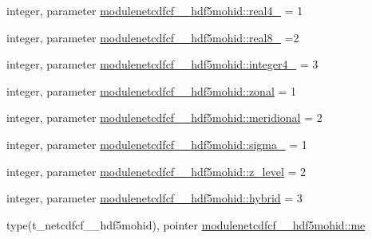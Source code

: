 \begin{DoxyCompactItemize}
\item 
integer, parameter \mbox{\hyperlink{namespacemodulenetcdfcf__2__hdf5mohid_a1839df8ab39bee44f30beaf7101ddcfc}{modulenetcdfcf\+\_\+\_\+hdf5mohid\+::real4\+\_\+}} = 1
\item 
integer, parameter \mbox{\hyperlink{namespacemodulenetcdfcf__2__hdf5mohid_ad75185339675809679215a369cbf65fa}{modulenetcdfcf\+\_\+\_\+hdf5mohid\+::real8\+\_\+}} =2
\item 
integer, parameter \mbox{\hyperlink{namespacemodulenetcdfcf__2__hdf5mohid_a6451136b901733e7e33a2ad13c62d2ba}{modulenetcdfcf\+\_\+\_\+hdf5mohid\+::integer4\+\_\+}} = 3
\item 
integer, parameter \mbox{\hyperlink{namespacemodulenetcdfcf__2__hdf5mohid_ad29870bbe3fad84a588db8bc5ab5fe1a}{modulenetcdfcf\+\_\+\_\+hdf5mohid\+::zonal}} = 1
\item 
integer, parameter \mbox{\hyperlink{namespacemodulenetcdfcf__2__hdf5mohid_aeb24e32948307415ab69fb7b05de6ae7}{modulenetcdfcf\+\_\+\_\+hdf5mohid\+::meridional}} = 2
\item 
integer, parameter \mbox{\hyperlink{namespacemodulenetcdfcf__2__hdf5mohid_aa77dc62d5ffd7b32add308a33868ad75}{modulenetcdfcf\+\_\+\_\+hdf5mohid\+::sigma\+\_\+}} = 1
\item 
integer, parameter \mbox{\hyperlink{namespacemodulenetcdfcf__2__hdf5mohid_a43af71e0d1401256505ae84b237fdd16}{modulenetcdfcf\+\_\+\_\+hdf5mohid\+::z\+\_\+level}} = 2
\item 
integer, parameter \mbox{\hyperlink{namespacemodulenetcdfcf__2__hdf5mohid_a6d038ac528c4242744ff281cef0b7b56}{modulenetcdfcf\+\_\+\_\+hdf5mohid\+::hybrid}} = 3
\item 
type(t\+\_\+netcdfcf\+\_\+\_\+hdf5mohid), pointer \mbox{\hyperlink{namespacemodulenetcdfcf__2__hdf5mohid_a5da8515dcb5378620b9fe7c77d3d47c6}{modulenetcdfcf\+\_\+\_\+hdf5mohid\+::me}}
\end{DoxyCompactItemize}
